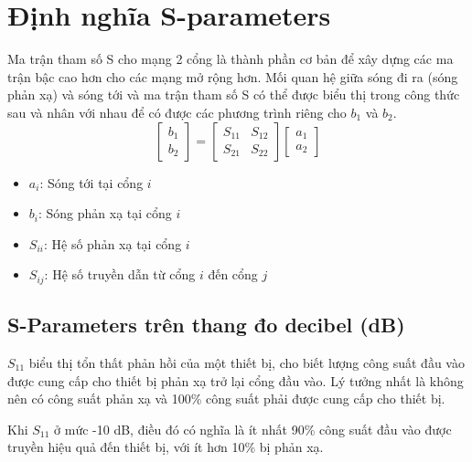     \section{Định nghĩa S-parameters}
        Ma trận tham số S cho mạng 2 cổng là thành phần cơ bản để xây dựng các ma trận bậc cao hơn cho các mạng mở rộng hơn. 
        Mối quan hệ giữa sóng đi ra (sóng phản xạ) và sóng tới và ma trận tham số S có thể được biểu thị 
        trong công thức sau và nhân với nhau để có được các phương trình riêng cho $b_1$ và $b_2$.
        \cite{cadence2023sparams}
        \begin{equation}
            \begin{bmatrix}
                b_1 \\
                b_2
            \end{bmatrix}
                =
            \begin{bmatrix}
                S_{11} & S_{12} \\
                S_{21} & S_{22}
            \end{bmatrix}
            \begin{bmatrix}
                a_1 \\
                a_2
            \end{bmatrix}
        \end{equation}
        \begin{itemize}
            \item $a_i$: Sóng tới tại cổng $i$
            \item $b_i$: Sóng phản xạ tại cổng $i$
            \item $S_{ii}$: Hệ số phản xạ tại cổng $i$
            \item $S_{ij}$: Hệ số truyền dẫn từ cổng $i$ đến cổng $j$
        \end{itemize}

        \subsection{S-Parameters trên thang đo decibel (dB)}
            $S_{11}$ biểu thị tổn thất phản hồi của một thiết bị, 
            cho biết lượng công suất đầu vào được cung cấp cho thiết bị 
            phản xạ trở lại cổng đầu vào. 
            Lý tưởng nhất là không nên có công suất phản xạ và 
            100\% công suất phải được cung cấp cho thiết bị.\par

            Khi $S_{11}$ ở mức -10 dB, điều đó có nghĩa là ít nhất 90\% 
            công suất đầu vào được truyền hiệu quả đến thiết bị, 
            với ít hơn 10\% bị phản xạ.

